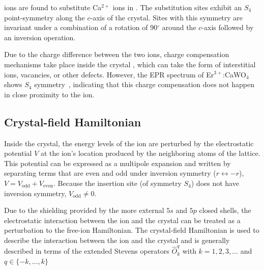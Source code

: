 \Er ions are found to substitute Ca$^{2+}$ ions in \Ca. The substitution sites exhibit an $S_4$ point-symmetry along the $c$-axis of the crystal. Sites with this symmetry are invariant under a combination of a rotation of 90$^\circ$ around the $c$-axis followed by an inversion operation. 

Due to the charge difference between the two ions, charge compensation mechanisms take place inside the crystal , which can take the form of interstitial ions, vacancies, or other defects. However, the EPR spectrum of Er$^{3+}$:CaWO$_4$ shows $S_4$ symmetry~, indicating that this charge compensation does not happen in close proximity to the ion.

\subsection{Crystal-field Hamiltonian}

Inside the crystal, the energy levels of the \Er ion are perturbed by the electrostatic potential $V$ at the ion's location produced by the neighboring atoms of the lattice. This potential can be expressed as a multipole expansion and written by separating terms that are even and odd under inversion symmetry ($r \leftrightarrow -r$), $V = V_\mathrm{odd} + V_\mathrm{even}$. Because the \Er insertion site (of symmetry $S_4$) does not have inversion symmetry, $V_\mathrm{odd} \neq 0$. 


Due to the shielding provided by the more external $5s$ and $5p$ closed shells, the electrostatic interaction between the ion and the crystal can be treated as a perturbation to the free-ion Hamiltonian. The crystal-field Hamiltonian is used to describe the interaction between the ion and the crystal and is generally described in terms of the extended Stevens operators $\hat{O}^q_k$ with $k=1,2,3,\dots$ and $q \in \{-k,\dots, k\}$ 

